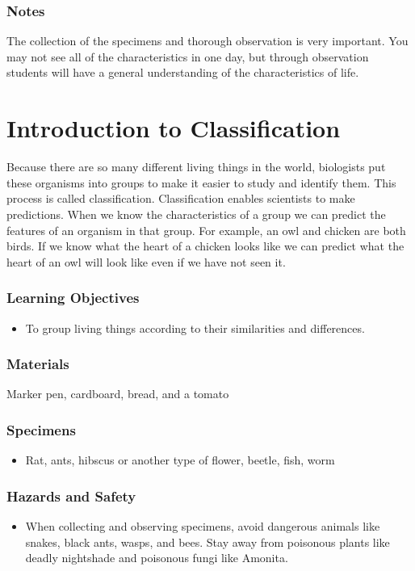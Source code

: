 \subsubsection*{Notes}
The collection of the specimens and thorough observation is very important. You may not see all of the characteristics in one day, but through observation students will have a general understanding of the characteristics of life.


\section{Introduction to Classification}
Because there are so many different living things in the world, biologists put these organisms into groups to make it easier to study and identify them. This process is called classification. Classification enables scientists to make predictions. When we know the characteristics of a group we can predict the features of an organism in that group. For example, an owl and chicken are both birds. If we know what the heart of a chicken looks like we can predict what the heart of an owl will look like even if we have not seen it.

\subsubsection*{Learning Objectives}
\begin{itemize}
\item{To group living things according to their similarities and differences.}
\end{itemize}

\subsubsection*{Materials}
Marker pen, cardboard, bread, and a tomato

\subsubsection*{Specimens}
\begin{itemize}
\item{Rat, ants, hibscus or another type of flower, beetle, fish, worm}
\end{itemize}

\subsubsection*{Hazards and Safety}
\begin{itemize}
\item{When collecting and observing specimens, avoid dangerous animals like snakes, black ants, wasps, and bees. Stay away from poisonous plants like deadly nightshade and poisonous fungi like Amonita.}
\end{itemize}

